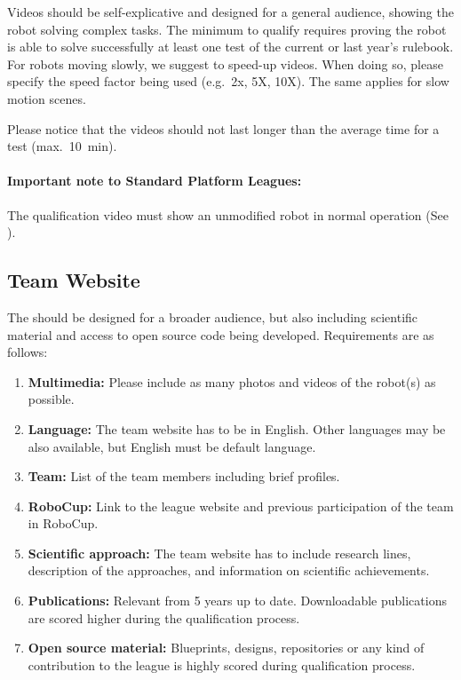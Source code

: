 Videos should be self-explicative and designed for a general audience, showing the  robot solving complex tasks. The minimum to qualify requires proving the robot is able to solve successfully at least one test of the current or last year's rulebook. For robots moving slowly, we suggest to speed-up videos. When doing so, please specify the speed factor being used (e.g.~2x, 5X, 10X). The same applies for slow motion scenes. 

Please notice that the videos should not last longer than the average time for a test (max.~\SI{10}{\minute}).

\paragraph{Important note to Standard Platform Leagues:} The qualification video must show an unmodified robot in normal operation (See ).

\subsection{Team Website}

The  should be designed for a broader audience, but also including scientific material and access to open source code being developed. Requirements are as follows:

\begin{enumerate}

	\item \textbf{Multimedia: } Please include as many photos and videos of the robot(s) as possible.

	\item \textbf{Language: } The team website has to be in English. Other languages may be also available, but English must be default language.

	\item \textbf{Team: } List of the team members including brief profiles.

	\item \textbf{RoboCup:} Link to the league website and previous participation of the team in RoboCup.

	\item \textbf{Scientific approach: } The team website has to include research lines, description of the approaches, and information on scientific achievements.

	\item \textbf{Publications: } Relevant  from 5 years up to date. Downloadable publications are scored higher during the qualification process.

	\item \textbf{Open source material: } Blueprints, designs, repositories or any kind of contribution to the league is highly scored during qualification process.
\end{enumerate}


